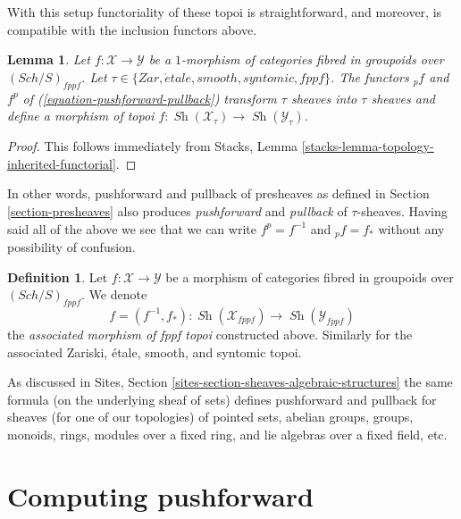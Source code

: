 \documentclass{stacks-project}
\theoremstyle{plain}
\newtheorem{lemma}[subsection]{Lemma}
\theoremstyle{definition}
\newtheorem{definition}[subsection]{Definition}
\theoremstyle{remark}
\numberwithin{equation}{subsection}
\def\Sch{\mathit{Sch}}
\def\Sh{\mathop{\mathit{Sh}}\nolimits}
\def\etale{{\acute{e}tale}}
\begin{document}
\medskip\noindent
With this setup functoriality of these topoi is straightforward, and
moreover, is compatible with the inclusion functors above.

\begin{lemma}
\label{lemma-functoriality-sheaves}
Let $f : \mathcal{X} \to \mathcal{Y}$ be a $1$-morphism of categories
fibred in groupoids over $(\Sch/S)_{fppf}$. Let
$\tau \in \{Zar, \etale, smooth, syntomic, fppf\}$.
The functors ${}_pf$ and $f^p$ of (\ref{equation-pushforward-pullback})
transform $\tau$ sheaves into $\tau$ sheaves and define a morphism
of topoi
$f : \Sh(\mathcal{X}_\tau) \to \Sh(\mathcal{Y}_\tau)$.
\end{lemma}

\begin{proof}
This follows immediately from
Stacks, Lemma \ref{stacks-lemma-topology-inherited-functorial}.
\end{proof}

\noindent
In other words, pushforward and pullback of presheaves as defined in
Section \ref{section-presheaves}
also produces {\it pushforward} and {\it pullback} of $\tau$-sheaves.
Having said all of the above we see that we can write $f^p = f^{-1}$
and ${}_pf = f_*$ without any possibility of confusion.

\begin{definition}
\label{definition-morphism}
Let $f : \mathcal{X} \to \mathcal{Y}$ be a morphism of categories
fibred in groupoids over $(\Sch/S)_{fppf}$. We denote
$$
f = (f^{-1}, f_*) :
\Sh(\mathcal{X}_{fppf})
\longrightarrow
\Sh(\mathcal{Y}_{fppf})
$$
the {\it associated morphism of fppf topoi} constructed above.
Similarly for the associated Zariski, \'etale, smooth, and syntomic topoi.
\end{definition}

\noindent
As discussed in
Sites, Section \ref{sites-section-sheaves-algebraic-structures}
the same formula (on the underlying sheaf of sets) defines
pushforward and pullback for sheaves (for one of our topologies)
of pointed sets, abelian groups, groups, monoids, rings, modules
over a fixed ring, and lie algebras over a fixed field, etc.








\section{Computing pushforward}
\label{section-pushforward}
\end{document}
